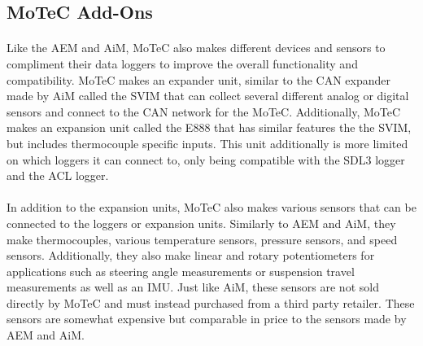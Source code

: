 \subsection{MoTeC Add-Ons}

\paragraph{}
Like the AEM and AiM, MoTeC also makes different devices and sensors to compliment their data loggers to improve the overall functionality and compatibility.
MoTeC makes an expander unit, similar to the CAN expander made by AiM called the SVIM that can collect several different analog or digital sensors and connect to the CAN network for the MoTeC.
Additionally, MoTeC makes an expansion unit called the E888 that has similar features the the SVIM, but includes thermocouple specific inputs.
This unit additionally is more limited on which loggers it can connect to, only being compatible with the SDL3 logger and the ACL logger.

\paragraph{}
In addition to the expansion units, MoTeC also makes various sensors that can be connected to the loggers or expansion units.
Similarly to AEM and AiM, they make thermocouples, various temperature sensors, pressure sensors, and speed sensors.
Additionally, they also make linear and rotary potentiometers for applications such as steering angle measurements or suspension travel measurements as well as an IMU.
Just like AiM, these sensors are not sold directly by MoTeC and must instead purchased from a third party retailer.
These sensors are somewhat expensive but comparable in price to the sensors made by AEM and AiM.